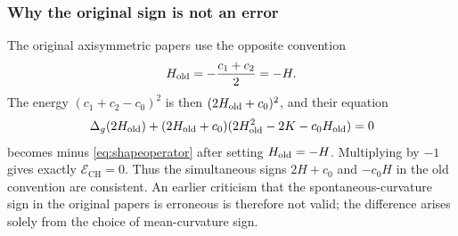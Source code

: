 \documentclass[preprint,amsmath,amssymb,aps,prl,superscriptaddress,nofootinbib,floatfix]{revtex4-2}
\newcommand{\E}{\mathcal E}
\newcommand{\CH}{\mathrm{CH}}
\begin{document}
\subsubsection{Why the original sign is not an error}
The original axisymmetric papers use the opposite convention
\[
H_{\rm old}=-\frac{c_1+c_2}{2}=-H.
\]
The energy \((c_1+c_2-c_0)^2\) is then \((2H_{\rm old}+c_0)^2\), and their equation
\begin{equation}
\Delta_g(2H_{\rm old})+(2H_{\rm old}+c_0)(2H_{\rm old}^2-2K-c_0H_{\rm old})=0\label{eq:oldsign}
\end{equation}
becomes minus \eqref{eq:shapeoperator} after setting \(H_{\rm old}=-H\). Multiplying by \(-1\) gives exactly \(\E_{\CH}=0\). Thus the simultaneous signs \(2H+c_0\) and \(-c_0H\) in the old convention are consistent. An earlier criticism that the spontaneous-curvature sign in the original papers is erroneous is therefore not valid; the difference arises solely from the choice of mean-curvature sign.
\end{document}
